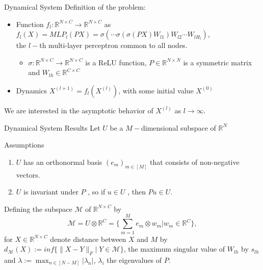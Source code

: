 \documentclass{beamer}
\theoremstyle{definition}
\begin{document}
\begin{frame}{Dynamical System}
    Definition of the problem:
    \begin{itemize}
        \item Function \(f_{l}:\mathbb{R}^{N\times C}\rightarrow\mathbb{R}^{N\times C}\) as \(f_{l}(X)=MLP_{l}(PX)=\sigma(\cdots\sigma(\sigma(PX)W_{l1})W_{l2}\cdots W_{lH_{l}})\), \\ the \(l-\)th multi-layer perceptron common to all nodes. 
        \begin{itemize}
            \item \(\sigma:\mathbb{R}^{N\times C}\rightarrow\mathbb{R}^{N\times C}\) is a ReLU function, \(P\in\mathbb{R}^{N\times N}\) is a symmetric matrix and \(W_{lh}\in\mathbb{R}^{C\times C}\)
        \end{itemize}
        \item Dynamics \(X^{(l+1)}=f_{l}(X^{(l)})\), with some initial value \(X^{(0)}\)
    \end{itemize}
    \bigskip
    We are interested in the asymptotic behavior of \(X^{(l)}\) as \(l\rightarrow\infty\).
\end{frame}

\begin{frame}{Dynamical System Results}
    Let \(U\) be a \(M-\)dimensional subspace of \(\mathbb{R}^{N}\)
    \begin{block}{Assumptions}
        \begin{enumerate}
            \item \(U\) has an orthonormal basis \((e_{m})_{m\in[M]}\) that consists of non-negative vectors.
            \item \(U\) is invariant under \(P\) , so if \(u \in U\) , then \(Pu \in U\).
        \end{enumerate}    
    \end{block} \pause
    Defining the subspace \(\mathcal{M}\) of \(\mathbb{R}^{N\times C}\) by \[\mathcal{M}=U\otimes\mathbb{R}^C=\{\sum_{m=1}^{M}e_{m}\otimes w_{m}|w_{m}\in \mathbb{R}^C\},\]  for \(X\in \mathbb{R}^{N\times C}\) denote distance between \(X\) and \(M\) by \(d_{\mathcal{M}}(X) := inf\{\|X-Y\|_{F} |\; Y \in \mathcal{M}\}\), the maximum singular value of \(W_{lh}\) by \(s_{lh}\) and \(\lambda:=\max_{n\in[N-M]}{|\lambda_{n}|}\), \(\lambda_{i}\) the eigenvalues of \(P\). 
\end{frame}
\end{document}
